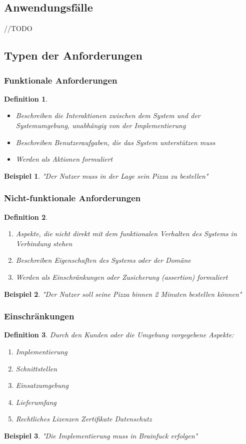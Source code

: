 \documentclass[a4paper]{article}
\theoremstyle{break}
\newtheorem{defi}{Definition}[section]
\newtheorem{ex}{Beispiel}[section]
\begin{document}
\subsection{Anwendungsfälle}
//TODO
\subsection{Typen der Anforderungen}
\subsubsection{Funktionale Anforderungen}
\begin{defi}
	\begin{itemize}
		\item Beschreiben die Interaktionen zwischen dem System und der Systemumgebung, unabhängig von der Implementierung
		\item Beschreiben Benutzeraufgaben, die das System unterstützen muss
		\item Werden als Aktionen formuliert
	\end{itemize}
\end{defi}
\begin{ex}
	"Der Nutzer muss in der Lage sein Pizza zu bestellen"
\end{ex}
\subsubsection{Nicht-funktionale Anforderungen}
\begin{defi}
	\begin{enumerate}
		\item Aspekte, die nicht direkt mit dem funktionalen Verhalten des Systems in Verbindung stehen
		\item Beschreiben Eigenschaften des Systems oder der Domäne
		\item Werden als Einschränkungen oder Zusicherung (assertion)
		formuliert
	\end{enumerate}
\end{defi}
\begin{ex}
	"Der Nutzer soll seine Pizza binnen 2 Minuten bestellen können"
\end{ex}
\subsubsection{Einschränkungen}
\begin{defi}
	Durch den Kunden oder die Umgebung vorgegebene Aspekte:\newline
	\begin{enumerate}
		\item Implementierung
		\item Schnittstellen
		\item Einsatzumgebung
		\item Lieferumfang
		\item Rechtliches
			\subitem Lizenzen
			\subitem Zertifikate
			\subitem Datenschutz
	\end{enumerate}
\end{defi}
\begin{ex}
	"Die Implementierung muss in Brainfuck erfolgen" 
\end{ex}
\end{document}
